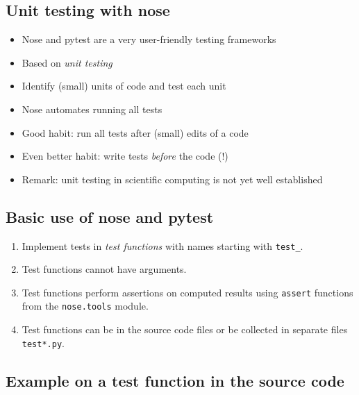 \documentclass[%
oneside,                 %
final,                   %
10pt]{article}
\begin{document}
\subsection*{Unit testing with nose}


\begin{itemize}
 \item Nose and pytest are a very user-friendly testing frameworks

 \item Based on \emph{unit testing}

 \item Identify (small) units of code and test each unit

 \item Nose automates running all tests

 \item Good habit: run all tests after (small) edits of a code

 \item Even better habit: write tests \emph{before} the code (!)

 \item Remark: unit testing in scientific computing is not yet well established
\end{itemize}

\noindent
\subsection*{Basic use of nose and pytest}

\begin{enumerate}
 \item Implement tests in \emph{test functions} with names starting with \Verb!test_!.

 \item Test functions cannot have arguments.

 \item Test functions perform assertions on computed results
    using \texttt{assert} functions from the \texttt{nose.tools} module.

 \item Test functions can be in the source code files or be
    collected in separate files \texttt{test*.py}.
\end{enumerate}

\noindent
\subsection*{Example on a test function in the source code}
\end{document}
